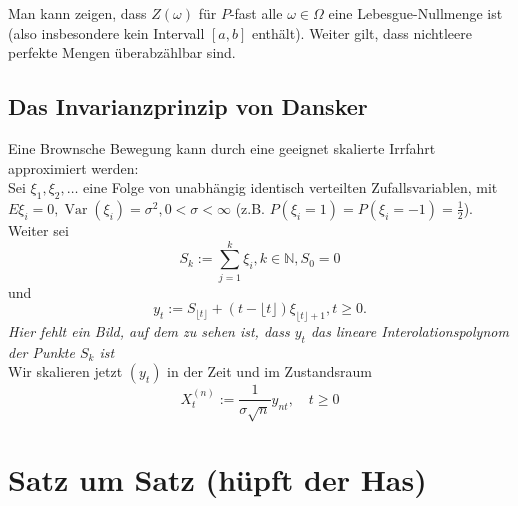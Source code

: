 \documentclass[a4paper,twoside,DIV15,BCOR12mm]{scrbook}
\begin{document}
\begin{bemerkung}
  Man kann zeigen, dass $Z(\omega)$ für $P$-fast alle $\omega\in\Omega$ eine Lebesgue-Nullmenge ist  (also insbesondere kein Intervall $[a,b]$ enthält). Weiter gilt, dass nichtleere perfekte Mengen überabzählbar sind.
\section{Das Invarianzprinzip von Dansker}
Eine Brownsche Bewegung kann durch eine geeignet skalierte Irrfahrt approximiert werden: \\
Sei $\xi_1,\xi_2,\dots$ eine Folge von unabhängig identisch verteilten Zufallsvariablen, mit $E\xi_i=0, \operatorname{Var}(\xi_i)=\sigma^2,0<\sigma<\infty$ (z.B. $P(\xi_i=1)=P(\xi_i=-1)=\frac{1}{2}$). Weiter sei
\[
S_k:=\sum_{j=1}^k\xi_i,k\in\mathbb N,S_0=0
\]
und
\[
y_t:=S_{\lfloor t\rfloor}+(t-\lfloor t\rfloor)\xi_{\lfloor t\rfloor+1},t\geq0.
\]
\emph{Hier fehlt ein Bild, auf dem zu sehen ist, dass $y_t$ das lineare Interolationspolynom der Punkte $S_k$ ist} \\
Wir skalieren jetzt $(y_t)$ in der Zeit und im Zustandsraum
\[
X_t^{(n)}:=\frac{1}{\sigma\sqrt{n}}y_{nt},\quad t\geq0
\]
\end{bemerkung}

\chapter{Satz um Satz (hüpft der Has)}

\renewcommand{\indexname}{Stichwortverzeichnis}
\addtocounter{chapter}{1}
\printindex
\end{document}
